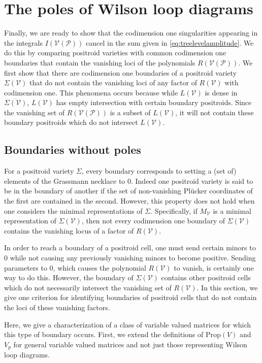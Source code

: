 \documentclass[11pt]{article}
\newcommand{\cP}{\mathcal{P}}
\newcommand{\cV}{\mathcal{V}}
\newcommand{\VP}{\cV(\cP)}
\newcommand{\Prop}{\textrm{Prop}}
\theoremstyle{remark}
\theoremstyle{definition}
\begin{document}
\section{The poles of Wilson loop diagrams \label{sec:poles}}

Finally, we are ready to show that the codimension one singularities appearing in the integrals $I(\VP)$ cancel in the sum given in \eqref{eq:treelevelamplitude}. We do this by comparing positroid varieties with common codimension one boundaries that contain the vanishing loci of the polynomials $R(\VP)$. We first show that there are codimension one boundaries of a positroid variety $\Sigma(\cV)$ that do not contain the vanishing loci of any factor of $R(\cV)$ with codimension one. This phenomena occurs because while $L(\cV)$ is dense in $\overline{\Sigma(\cV)}$, $L(\cV)$ has empty intersection with certain boundary positroids. Since the vanishing set of $R(\VP)$ is a subset of $L(\cV)$, it will not contain these boundary positroids which do not intersect $L(\cV)$.

\subsection{Boundaries without poles \label{sec:boundarysanspoles}}

For a positroid variety $\Sigma$, every boundary corresponds to setting a (set of) elements of the Grassmann necklace to 0. Indeed one positroid variety is said to be in the boundary of another if the set of non-vanishing Pl{\"u}cker coordinates of the first are contained in the second. However, this property does not hold when one considers the minimal representations of $\Sigma$. Specifically, if $M_\cV$ is a minimal representation of $\Sigma(\cV)$, then not every codimension one boundary of $\Sigma(\cV)$ contains the vanishing locus of a factor of $R(\cV)$.

In order to reach a boundary of a positroid cell, one must send certain minors to 0 while not causing any previously vanishing minors to become positive. Sending parameters to $0$, which causes the polynomial $R(\cV)$ to vanish, is certainly one way to do this. However, the boundary of $\Sigma(\cV)$ contains other positroid cells which do not necessarily intersect the vanishing set of $R(\cV)$. In this section, we give one criterion for identifying boundaries of positroid cells that do not contain the loci of these vanishing factors. 

Here, we give a characterization of a class of variable valued matrices for which this type of boundary occurs. First, we extend the definitions of $\Prop(V)$ and $V_p$ for general variable valued matrices and not just those representing Wilson loop diagrams.
\end{document}
